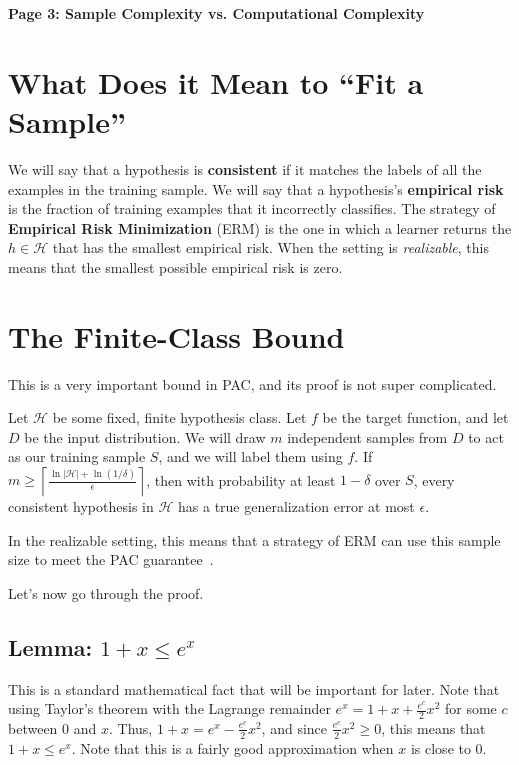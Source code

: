 \documentclass[11pt,fleqn]{article}
\newcommand{\Hy}{\mathcal H}
\newcommand{\eps}{\epsilon}
\begin{document}
\raggedright
\setlength{\parskip}{0.6em}

{\LARGE\bfseries Page 3: Sample Complexity vs. Computational Complexity\par}
\medskip

\section{What Does it Mean to ``Fit a Sample''}

We will say that a hypothesis is \textbf{consistent} if it matches the labels of all the examples in the training sample. We will say that a hypothesis's \textbf{empirical risk} is the fraction of training examples that it incorrectly classifies. The strategy of \textbf{Empirical Risk Minimization} (ERM) is the one in which a learner returns the $h \in \Hy$ that has the smallest empirical risk. When the setting is \textit{realizable}, this means that the smallest possible empirical risk is zero.

\section{The Finite-Class Bound}

This is a very important bound in PAC, and its proof is not super complicated.\par

Let $\Hy$ be some fixed, finite hypothesis class. Let $f$ be the target function, and let $D$ be the input distribution. We will draw $m$ independent samples from $D$ to act as our training sample $S$, and we will label them using $f$. If $\boxed{m \geq \left\lceil \frac{\ln |\Hy| + \ln(1/\delta)}{\epsilon} \right\rceil}$, then with probability at least $1 - \delta$ over $S$, every consistent hypothesis in $\Hy$ has a true generalization error at most $\eps$.

In the realizable setting, this means that a strategy of ERM can use this sample size to meet the PAC guarantee~\cite{kv,ssbd}.

Let's now go through the proof.

\subsection*{Lemma: $1 + x \leq e^x$}

This is a standard mathematical fact that will be important for later. Note that using Taylor's theorem with the Lagrange remainder $e^x = 1 + x + \frac{e^c}{2}x^2$ for some $c$ between $0$ and $x$. Thus, $1 + x = e^x - \frac{e^c}{2}x^2$, and since $\frac{e^c}{2}x^2 \geq 0$, this means that $1 + x \leq e^x$. Note that this is a fairly good approximation when $x$ is close to 0.
\end{document}
